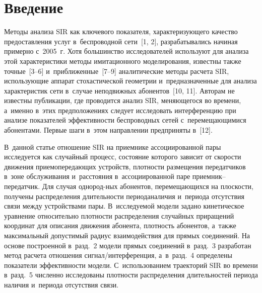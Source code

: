 
\vspace*{-6pt}




\thispagestyle{headings}

\begin{multicols}{2}

\label{st\stat}


\section{Введение}

  Методы анализа SIR 
  как ключевого показателя, характеризующего качество предоставления 
услуг в~беспроводной сети~[1, 2], разрабатывались начиная примерно с~2005~г. 
Хотя большинство исследователей используют для анализа этой 
характеристики методы имитационного моделирования, известны также 
точные~[3--6] и~приближенные~[7--9] аналитические методы расчета SIR, 
использующие аппарат стохастической геометрии и~предназначенные для 
анализа характеристик сети в~случае неподвижных абонентов~[10, 11].
%
 Авторам 
не известны публикации, где проводится анализ SIR, меняющегося 
во времени, а~именно в~этих предположениях следует исследовать 
интерференцию при анализе показателей эффективности беспроводных сетей 
с~перемещающимися абонентами. Первые шаги в~этом направлении 
предприняты в~[12]. 

В~данной статье отношение SIR на приемнике 
ассоциированной пары исследуется как случайный процесс, состояние которого 
зависит от ско\-рости движения при\-емо\-пе\-ре\-да\-ющих устройств, плот\-ности 
размещения передатчиков в~зоне об\-служивания и~расстояния 
в~ассоциированной паре при\-ем\-ник--пе\-ре\-дат\-чик. Для случая однород-\linebreak ных 
абонентов, перемещающихся на плоскости, получены распределения 
длительности периода\linebreak наличия и~периода отсутствия связи между 
устройствами пары. В~исследуемой модели задано кинетическое уравнение 
относительно плотности распределения случайных приращений координат для 
описания движения абонента, плотность абонентов, а~также максимальный 
допустимый радиус взаимодействия для прямых соединений. 
%
На основе 
построенной в~разд.~2 модели прямых соединений в~разд.~3 разработан метод 
расчета отношения сигнал/интерференция, а~в~разд.~4 определены показатели 
эффективности модели. 
%
С~использованием траекторий SIR во времени 
в~разд.~5 численно исследованы плотности распределения длительностей 
периода наличия и~периода отсутствия связи.


\end{multicols}
